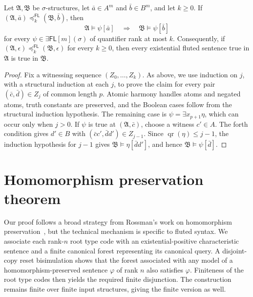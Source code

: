 \documentclass{lmcs}
\newcommand{\FL}{\mathsf{FL}}
\newcommand{\EFL}{\exists\mathsf{FL}}
\newcommand{\qr}{\operatorname{qr}}
\newcommand{\A}{\mathfrak{A}}
\newcommand{\B}{\mathfrak{B}}
\begin{document}
\begin{prop}
\label{prop:existential-transfer}
Let $\A,\B$ be $\sigma$-structures, let $\bar a\in A^m$ and
$\bar b\in B^m$, and let $k\geq0$.  If
$(\A,\bar a)\preccurlyeq_k^{\FL}(\B,\bar b)$, then
\[
  \A\models\psi[\bar a]
  \quad\Longrightarrow\quad
  \B\models\psi[\bar b]
\]
for every $\psi\in\EFL[m](\sigma)$ of quantifier rank at most $k$.
Consequently, if
$(\A,\epsilon)\preccurlyeq_k^{\FL}(\B,\epsilon)$ for every $k\geq0$, then
every existential fluted sentence true in $\A$ is true in $\B$.
\end{prop}

\begin{proof}
Fix a witnessing sequence $(Z_0,\ldots,Z_k)$.  As above, we use induction on
$j$, with a structural induction at each $j$, to prove the claim for every
pair $(\bar c,\bar d)\in Z_j$ of common length $p$.  Atomic harmony handles
atoms and negated atoms, truth constants are preserved, and the Boolean
cases follow from the structural induction hypothesis.  The remaining case is
$\psi=\exists x_{p+1}\eta$, which can occur only when $j>0$.  If $\psi$ is
true at $(\A,\bar c)$, choose a witness $c'\in A$.  The forth condition gives $d'\in B$
with $(\bar c c',\bar d d')\in Z_{j-1}$.  Since $\qr(\eta)\leq j-1$, the
induction hypothesis for $j-1$ gives $\B\models\eta[\bar d d']$, and hence
$\B\models\psi[\bar d]$.
\end{proof}
\section{Homomorphism preservation theorem}\label{sec:hpt}
Our proof follows a broad strategy from Rossman's work on homomorphism
preservation~\cite{Rossman2008}, but the technical mechanism is specific to
fluted syntax.  We associate each rank-$n$ root type code with an
existential-positive characteristic sentence and a finite canonical forest
representing its canonical query.  A disjoint-copy reset bisimulation shows
that the forest associated with any model of a homomorphism-preserved sentence
$\varphi$ of rank $n$ also satisfies $\varphi$.  Finiteness of the root type
codes then yields the required finite disjunction.  The construction remains
finite over finite input structures, giving the finite version as well.
\end{document}
